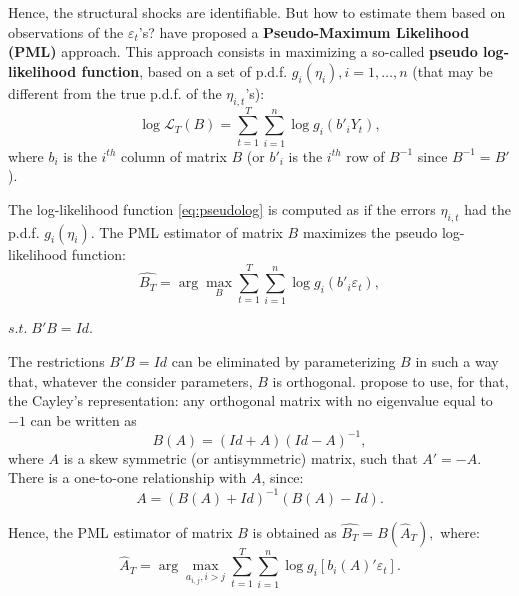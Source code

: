 \documentclass[
  12pt,
]{book}
\theoremstyle{definition}
\theoremstyle{definition}
\theoremstyle{definition}
\theoremstyle{definition}
\theoremstyle{remark}
\begin{document}
Hence, the structural shocks are identifiable. But how to estimate them based on observations of the \(\varepsilon_t\)'s? \citet{Gourieroux_Monfort_Renne_2017} have proposed a \textbf{Pseudo-Maximum Likelihood (PML)} approach. This approach consists in maximizing a so-called \textbf{pseudo log-likelihood function}, based on a set of p.d.f. \(g_i (\eta_i), i=1,\ldots,n\) (that may be different from the true p.d.f. of the \(\eta_{i,t}\)'s):
\begin{equation}
\log \mathcal{L}_T (B) = \sum^T_{t=1} \sum^n_{i=1} \log g_i (b'_i Y_t),\label{eq:pseudolog}
\end{equation}
where \(b_i\) is the \(i^{th}\) column of matrix \(B\) (or \(b'_i\) is the \(i^{th}\) row of \(B^{-1}\) since \(B^{-1}=B'\)).

The log-likelihood function \eqref{eq:pseudolog} is computed as if the errors \(\eta_{i,t}\) had the p.d.f. \(g_i (\eta_i)\). The PML estimator of matrix \(B\) maximizes the pseudo log-likelihood function:
\begin{equation}
\widehat{B_T} = \arg \max_B \sum^T_{t=1} \sum^n_{i=1} \log g_i (b'_i \varepsilon_t),\label{eq:optimprob}
\end{equation}

\centerline{$s.t. \;B'B = Id.$}

The restrictions \(B'B = Id\) can be eliminated by parameterizing \(B\) in such a way that, whatever the consider parameters, \(B\) is orthogonal. \citet{Gourieroux_Monfort_Renne_2017} propose to use, for that, the Cayley's representation: any orthogonal matrix with no eigenvalue equal to \(-1\) can be written as
\begin{equation}
B(A) = (Id+A) (Id-A)^{-1},
\end{equation}
where \(A\) is a skew symmetric (or antisymmetric) matrix, such that \(A'=-A\). There is a one-to-one relationship with \(A\), since:
\begin{equation}
A = (B(A)+Id)^{-1} (B(A)-Id).
\end{equation}

Hence, the PML estimator of matrix \(B\) is obtained as \(\widehat{B_T} = B(\hat{A}_T),\) where:
\begin{equation}
\hat{A}_T = \arg \max_{a_{i,j}, i>j} \sum^T_{t=1} \sum^n_{i=1} \log g_i [b_i (A)' \varepsilon_t].\label{eq:optimprob2}
\end{equation}
\end{document}
